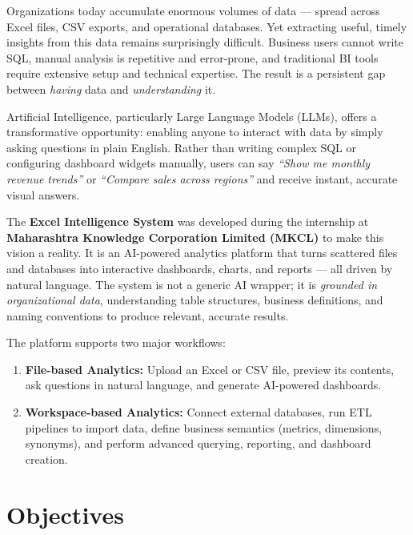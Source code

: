 \documentclass[12pt,a4paper]{report}
\begin{document}
Organizations today accumulate enormous volumes of data --- spread across Excel files, CSV exports, and operational databases. Yet extracting useful, timely insights from this data remains surprisingly difficult. Business users cannot write SQL, manual analysis is repetitive and error-prone, and traditional BI tools require extensive setup and technical expertise. The result is a persistent gap between \textit{having} data and \textit{understanding} it.

Artificial Intelligence, particularly Large Language Models (LLMs), offers a transformative opportunity: enabling anyone to interact with data by simply asking questions in plain English. Rather than writing complex SQL or configuring dashboard widgets manually, users can say \textit{``Show me monthly revenue trends''} or \textit{``Compare sales across regions''} and receive instant, accurate visual answers.

The \textbf{Excel Intelligence System} was developed during the internship at \textbf{Maharashtra Knowledge Corporation Limited (MKCL)} to make this vision a reality. It is an AI-powered analytics platform that turns scattered files and databases into interactive dashboards, charts, and reports --- all driven by natural language. The system is not a generic AI wrapper; it is \textit{grounded in organizational data}, understanding table structures, business definitions, and naming conventions to produce relevant, accurate results.

The platform supports two major workflows:
\begin{enumerate}[leftmargin=1.5cm]
    \item \textbf{File-based Analytics:} Upload an Excel or CSV file, preview its contents, ask questions in natural language, and generate AI-powered dashboards.
    \item \textbf{Workspace-based Analytics:} Connect external databases, run ETL pipelines to import data, define business semantics (metrics, dimensions, synonyms), and perform advanced querying, reporting, and dashboard creation.
\end{enumerate}

\section{Objectives}
\end{document}
